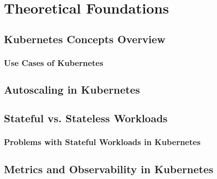 \newpage
\section{Theoretical Foundations}
\label{sec:theoretical-foundations}

\subsection{Kubernetes Concepts Overview}
\label{subsec:kubernetes-concepts}

\subsubsection{Use Cases of Kubernetes}
\label{subsec:use-cases}

\subsection{Autoscaling in Kubernetes}
\label{subsec:autoscaling}

\subsection{Stateful vs. Stateless Workloads}
\label{subsec:stateful-vs-stateless}

\subsubsection{Problems with Stateful Workloads in Kubernetes}
\label{subsec:problems-stateful-workloads}

\subsection{Metrics and Observability in Kubernetes}
\label{subsec:metrics-observability}